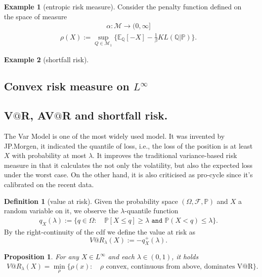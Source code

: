 \documentclass[a4paper,11pt]{book}
\newtheorem{proposition}[theorem]{Proposition}
\theoremstyle{definition}
\newtheorem{definition}{Definition}[section]
\newtheorem*{example}{Example}
\theoremstyle{remark}
\begin{document}
\begin{example}[entropic risk measure]
Consider the penalty function defined on the space of measure
\begin{align*}
	\alpha: \mathcal{M} \rightarrow (0, \infty]
\end{align*}
\begin{align*}
	\rho(X):= \sup_{Q \in \mathcal{M}_1} \bigg\{ \mathbb{E}_{\mathbb{Q}} [-X] - \frac{1}{\beta} KL(\mathbb{Q}|\mathbb{P}) \bigg\}.
\end{align*}
\end{example}

\begin{example}[shortfall risk]
	
\end{example}

\subsection{Convex risk measure on $L^\infty$}

\subsection{V$@$R, AV$@$R and shortfall risk.}
The Var Model is one of the most widely used model. It was invented by JP.Morgen, it indicated the quantile of loss, i.e., the loss of the position is at least $X$ with probability at most $\lambda$. It improves the traditional variance-based risk measure in that it calculates the not only the volatility, but also the expected loss under the worst case. On the other hand, it is also criticised as pro-cycle since it's calibrated on the recent data. 
\begin{definition}[value at risk]
	Given the probability space $(\Omega, \mathcal{F}, \mathbb{P})$ and $X$ a random variable on it, we observe the $\lambda$-quantile function
	\begin{align*}
		q_X(\lambda):= \{q \in \Omega:\quad \mathbb{P}[X \le q] \ge \lambda \texttt{ and } \mathbb{P}(X < q) \le \lambda \}. 
	\end{align*}
	By the right-continuity of the cdf we define the value at risk as
	\begin{equation}
		V@R_\lambda(X):= -q^+_X(\lambda). 
	\end{equation}
\end{definition}

\begin{proposition}
	For any $X \in L^\infty$ and each $\lambda \in (0, 1)$, it holds
	\begin{align*}
		V@R_\lambda(X) = \min_\rho \{ \rho(x): \quad \rho \text{ convex,  continuous from above, dominates V@R} \}.  
	\end{align*}
\end{proposition}
\end{document}
